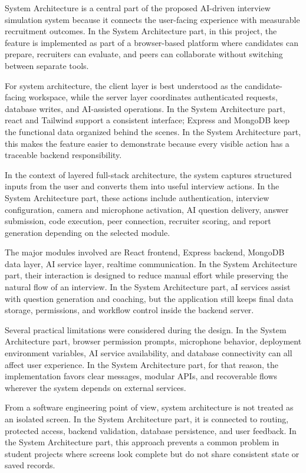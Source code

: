 \documentclass[12pt,a4paper]{report}
\begin{document}
System Architecture is a central part of the proposed AI-driven interview simulation system because it connects the user-facing experience with measurable recruitment outcomes. In the System Architecture part, in this project, the feature is implemented as part of a browser-based platform where candidates can prepare, recruiters can evaluate, and peers can collaborate without switching between separate tools.


For system architecture, the client layer is best understood as the candidate-facing workspace, while the server layer coordinates authenticated requests, database writes, and AI-assisted operations. In the System Architecture part, react and Tailwind support a consistent interface; Express and MongoDB keep the functional data organized behind the scenes. In the System Architecture part, this makes the feature easier to demonstrate because every visible action has a traceable backend responsibility.


In the context of layered full-stack architecture, the system captures structured inputs from the user and converts them into useful interview actions. In the System Architecture part, these actions include authentication, interview configuration, camera and microphone activation, AI question delivery, answer submission, code execution, peer connection, recruiter scoring, and report generation depending on the selected module.


The major modules involved are React frontend, Express backend, MongoDB data layer, AI service layer, realtime communication. In the System Architecture part, their interaction is designed to reduce manual effort while preserving the natural flow of an interview. In the System Architecture part, aI services assist with question generation and coaching, but the application still keeps final data storage, permissions, and workflow control inside the backend server.


Several practical limitations were considered during the design. In the System Architecture part, browser permission prompts, microphone behavior, deployment environment variables, AI service availability, and database connectivity can all affect user experience. In the System Architecture part, for that reason, the implementation favors clear messages, modular APIs, and recoverable flows wherever the system depends on external services.


From a software engineering point of view, system architecture is not treated as an isolated screen. In the System Architecture part, it is connected to routing, protected access, backend validation, database persistence, and user feedback. In the System Architecture part, this approach prevents a common problem in student projects where screens look complete but do not share consistent state or saved records.
\end{document}

